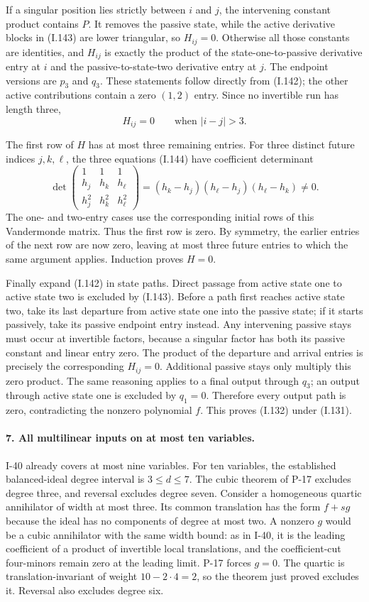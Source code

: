If a singular position lies strictly between $i$ and $j$, the
intervening constant product contains $P$. It removes the
passive state, while the active derivative blocks in (I.143)
are lower triangular, so $H_{ij}=0$. Otherwise all those
constants are identities, and $H_{ij}$ is exactly the product
of the state-one-to-passive derivative entry at $i$ and the
passive-to-state-two derivative entry at $j$. The endpoint
versions are $p_3$ and $q_3$. These statements follow directly
from (I.142); the other active contributions contain a zero
$(1,2)$ entry. Since no invertible run has length three,
\[
 H_{ij}=0\qquad\text{when }|i-j|>3.
 \tag{I.145}
\]

The first row of $H$ has at most three remaining entries.
For three distinct future indices $j,k,\ell$, the three
equations (I.144) have coefficient determinant
\[
 \det\begin{pmatrix}
 1&1&1\\h_j&h_k&h_\ell\\h_j^2&h_k^2&h_\ell^2
 \end{pmatrix}
 =(h_k-h_j)(h_\ell-h_j)(h_\ell-h_k)\ne0.
 \tag{I.146}
\]
The one- and two-entry cases use the corresponding initial
rows of this Vandermonde matrix. Thus the first row is zero.
By symmetry, the earlier entries of the next row are now zero,
leaving at most three future entries to which the same argument
applies. Induction proves $H=0$.

Finally expand (I.142) in state paths. Direct passage from
active state one to active state two is excluded by (I.143).
Before a path first reaches active state two, take its last
departure from active state one into the passive state; if it
starts passively, take its passive endpoint entry instead.
Any intervening passive stays must occur at invertible factors,
because a singular factor has both its passive constant and
linear entry zero. The product of the departure and arrival
entries is precisely the corresponding $H_{ij}=0$.
Additional passive stays only multiply this zero product.
The same reasoning applies to a final output through $q_3$;
an output through active state one is excluded by $q_1=0$.
Therefore every output path is zero, contradicting the
nonzero polynomial $f$. This proves (I.132) under (I.131).

\paragraph{7. All multilinear inputs on at most ten variables.}
I-40 already covers at most nine variables. For ten variables,
the established balanced-ideal degree interval is $3\le d\le7$.
The cubic theorem of P-17 excludes degree three, and reversal
excludes degree seven. Consider a homogeneous quartic
annihilator of width at most three. Its common translation has
the form $f+s g$ because the ideal has no components of degree
at most two. A nonzero $g$ would be a cubic annihilator with
the same width bound: as in I-40, it is the leading coefficient
of a product of invertible local translations, and the
coefficient-cut four-minors remain zero at the leading limit.
P-17 forces $g=0$. The quartic is translation-invariant of
weight $10-2\cdot4=2$, so the theorem just proved excludes it.
Reversal also excludes degree six.

